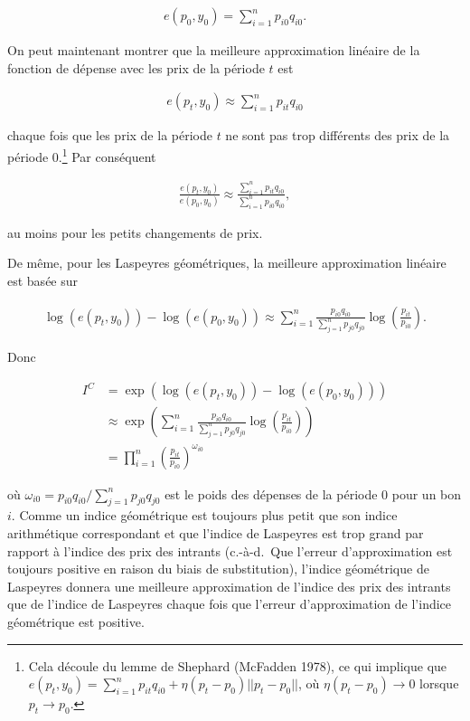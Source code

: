 \documentclass[
]{article}
\begin{document}
\begin{align*}
e(p_{0}, y_{0}) = \sum_{i = 1}^{n} p_{i0} q_{i0}.
\end{align*}

On peut maintenant montrer que la meilleure approximation linéaire de la fonction de dépense avec les prix de la période \(t\) est

\begin{align*}
e(p_{t}, y_{0}) \approx \sum_{i = 1}^{n} p_{it} q_{i0}
\end{align*}

chaque fois que les prix de la période \(t\) ne sont pas trop différents des prix de la période 0.\footnote{Cela découle du lemme de Shephard (McFadden 1978), ce qui implique que \(e(p_{t}, y_{0}) = \sum_{i = 1}^{n} p_{it} q_{i0} + \eta (p_{t} - p_{0}) || p_{t} - p_{0} ||\), où \(\eta(p_{t} - p_{0}) \rightarrow 0\) lorsque \(p_{t} \rightarrow p_{0}\).} Par conséquent

\begin{align*}
\frac{e(p_{t}, y_{0})}{e(p_{0}, y_{0})} \approx \frac{\sum_{i = 1}^{n} p_{it} q_{i0}} {\sum_{i = 1}^{n} p_{i0} q_{i0}},
\end{align*}

au moins pour les petits changements de prix.

De même, pour les Laspeyres géométriques, la meilleure approximation linéaire est basée sur

\begin{align*}
\log(e(p_{t}, y_{0})) - \log(e(p_{0}, y_{0})) \approx \sum_{i = 1}^{n} \frac{p_{i0} q_{i0}}{\sum_{j = 1}^{n} p_{j0} q_{j0}} \log \left(\frac{p_{it}}{p_{i0}} \right ).
\end{align*}

Donc

\begin{align*}
I^{C} &= \exp(\log(e (p_{t}, y_{0})) - \log(e (p_{0}, y_{0}))) \\
&\approx \exp\left(\sum_{i = 1}^{n} \frac{p_{i0} q_{i0}}{\sum_{j = 1}^{n} p_{j0} q_{j0 }} \log\left(\frac{p_{it}}{p_{i0}} \right) \right) \\
&= \prod_{i = 1}^{n} \left(\frac{p_{it}}{p_{i0}} \right)^{\omega_{i0}}
\end{align*}

où \(\omega_{i0} = p_{i0} q_{i0} / \sum_{j = 1}^{n} p_{j0} q_{j0}\) est le poids des dépenses de la période 0 pour un bon \(i\). Comme un indice géométrique est toujours plus petit que son indice arithmétique correspondant et que l'indice de Laspeyres est trop grand par rapport à l'indice des prix des intrants (c.-à-d.~Que l'erreur d'approximation est toujours positive en raison du biais de substitution), l'indice géométrique de Laspeyres donnera une meilleure approximation de l'indice des prix des intrants que de l'indice de Laspeyres chaque fois que l'erreur d'approximation de l'indice géométrique est positive.
\end{document}

